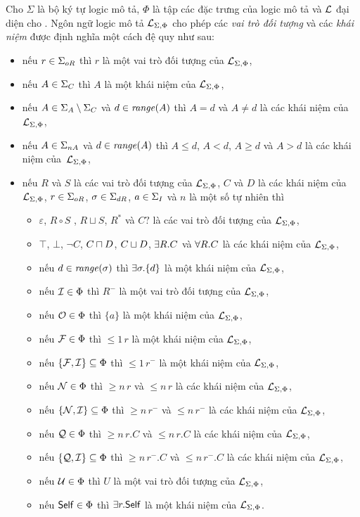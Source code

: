 \begin{Definition}
\label{def:LSPLanguage}
Cho $\Sigma$ là bộ ký tự logic mô tả, $\Phi$ là tập các đặc trưng của logic mô tả và $\mathcal{L}$ đại diện cho \ALCreg. Ngôn ngữ logic mô tả $\mathcal{L}_{\Sigma,\Phi}$ cho phép các {\em vai trò đối tượng} và các {\em khái niệm} được định nghĩa một cách đệ quy như sau:
\begin{itemize}
	\item nếu $r \in \Sigma_{oR}$ thì $r$ là một vai trò đối tượng của $\mathcal{L}_{\Sigma,\Phi}$,
	\item nếu $A \in \Sigma_C$ thì $A$ là một khái niệm của $\mathcal{L}_{\Sigma,\Phi}$,
	\item nếu $A \in \Sigma_A\setminus\Sigma_C$ và $d \in \mathit{range}(A)$ thì $A=d$ và $A \neq d$ là các khái niệm của~$\mathcal{L}_{\Sigma,\Phi}$,
	\item nếu $A \in \Sigma_{nA}$ và $d \in \mathit{range}(A)$ thì $A \leq d$, $A < d$, $A \geq d$ và $A > d$ là các khái niệm của~$\mathcal{L}_{\Sigma,\Phi}$,
	\item nếu $R$ và $S$ là các vai trò đối tượng của $\mathcal{L}_{\Sigma,\Phi}$, $C$ và $D$ là các khái niệm của $\mathcal{L}_{\Sigma,\Phi}$, $r \in \Sigma_{oR}$, $\sigma \in \Sigma_{dR}$, $a \in \Sigma_I$ và $n$ là một số tự nhiên thì
	\begin{itemize}
		\item $\varepsilon$, $R \circ S$ , $R \sqcup S$, $R^*$ và $C?$ là các vai trò đối tượng của $\mathcal{L}_{\Sigma,\Phi}$,
		\item $\top$, $\bot$, $\neg C$, $C \sqcap D$, $C \sqcup D$, $\exists R.C$ và $\forall R.C$ là các khái niệm của $\mathcal{L}_{\Sigma,\Phi}$,
		\item nếu $d \in \mathit{range}(\sigma)$ thì $\exists \sigma.\{d\}$ là một khái niệm của $\mathcal{L}_{\Sigma,\Phi}$,
		\item nếu $\mathcal{I} \in \Phi$ thì $R^-$ là một vai trò đối tượng của $\mathcal{L}_{\Sigma,\Phi}$,
		\item nếu $\mathcal{O} \in \Phi$ thì $\{a\}$ là một khái niệm của $\mathcal{L}_{\Sigma,\Phi}$,
		\item nếu $\mathcal{F} \in \Phi$ thì $\leq\!1\,r$ là một khái niệm của $\mathcal{L}_{\Sigma,\Phi}$,
		\item nếu $\{\mathcal{F}, \mathcal{I}\} \subseteq \Phi$ thì $\leq\!1\,r^-$ là một khái niệm của $\mathcal{L}_{\Sigma,\Phi}$,
		\item nếu $\mathcal{N} \in \Phi$ thì $\geq\!n\,r$ và $\leq\!n\,r$ là các khái niệm của $\mathcal{L}_{\Sigma,\Phi}$,
		\item nếu $\{\mathcal{N}, \mathcal{I}\} \subseteq \Phi$ thì $\geq\!n\,r^-$ và $\leq\!n\,r^-$ là các khái niệm của $\mathcal{L}_{\Sigma,\Phi}$,
		\item nếu $\mathcal{Q} \in \Phi$ thì $\geq\!n\,r.C$ và $\leq\!n\,r.C$ là các khái niệm của  $\mathcal{L}_{\Sigma,\Phi}$,
		\item nếu $\{\mathcal{Q}, \mathcal{I}\} \subseteq \Phi$ thì $\geq\!n\,r^-.C$ và $\leq\!n\,r^-.C$ là các khái niệm của $\mathcal{L}_{\Sigma,\Phi}$,
		\item nếu $\mathcal{U} \in \Phi$ thì $U$ là một vai trò đối tượng của $\mathcal{L}_{\Sigma,\Phi}$,
		\item nếu $\mathsf{Self} \in \Phi$ thì $\exists r.\mathsf{Self}$ là một khái niệm của $\mathcal{L}_{\Sigma,\Phi}$.\myend
	\end{itemize}
\end{itemize}
\end{Definition}

